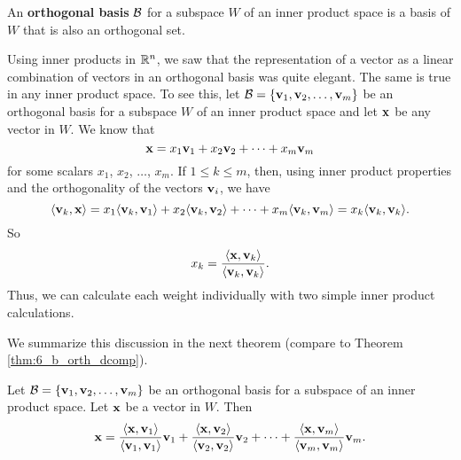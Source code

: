 \begin{definition} An \textbf{orthogonal basis} $\mathcal{B}$ for a subspace $W$ of an inner product space is a basis of $W$ that is also an orthogonal set.
\end{definition}

Using inner products in $\mathbb{R}^n$, we saw that the representation of a vector as a linear combination of vectors in an orthogonal basis was quite elegant. The same is true in any inner product space. To see this, let $\mathcal{B} = \{\mathbf{v}_1, \mathbf{v}_2, \ldots, \mathbf{v}_m\}$ be an orthogonal basis for a subspace $W$ of an inner product space and let $\mathbf{x}$ be any vector in $W$. We know that
\[\mathbf{x} = x_1\mathbf{v}_1 + x_2\mathbf{v}_2 + \cdots + x_m \mathbf{v}_m\]
for some scalars $x_1$, $x_2$, $\ldots$, $x_m$. If $1\leq k\leq m$, then, using inner product properties and the orthogonality of the vectors $\mathbf{v}_i$, we have
\[\langle \mathbf{v}_k, \mathbf{x} \rangle = x_1 \langle \mathbf{v}_k, \mathbf{v}_1 \rangle + x_2 \langle \mathbf{v}_k, \mathbf{v}_2 \rangle + \cdots + x_m \langle \mathbf{v}_k, \mathbf{v}_m \rangle = x_k \langle \mathbf{v}_k, \mathbf{v}_k \rangle.\]
So
\[x_k = \displaystyle \frac{\langle \mathbf{x}, \mathbf{v}_k \rangle}{\langle \mathbf{v}_k,  \mathbf{v}_k \rangle}.\]
Thus, we can calculate each weight individually with two simple inner product calculations. 


We summarize this discussion in the next theorem (compare to Theorem \ref{thm:6_b_orth_dcomp}).

\begin{theorem} \label{thm:6_c_orth_dcomp} Let $\mathcal{B} = \{\mathbf{v}_1, \mathbf{v}_2, \ldots, \mathbf{v}_m\}$ be an orthogonal basis for a subspace of an inner product space. Let $\mathbf{x}$ be a vector in $W$. Then
\begin{equation}
\mathbf{x} = \displaystyle \frac{\langle \mathbf{x}, \mathbf{v}_1 \rangle}{\langle \mathbf{v}_1, \mathbf{v}_1 \rangle} \mathbf{v}_1 +  \frac{\langle \mathbf{x}, \mathbf{v}_2 \rangle}{\langle \mathbf{v}_2, \mathbf{v}_2 \rangle} \mathbf{v}_2 + \cdots + \frac{\langle \mathbf{x}, \mathbf{v}_m \rangle}{\langle \mathbf{v}_m, \mathbf{v}_m \rangle} \mathbf{v}_m. \label{eq:6_c_orth_decomp_ips}
\end{equation}
\end{theorem}


